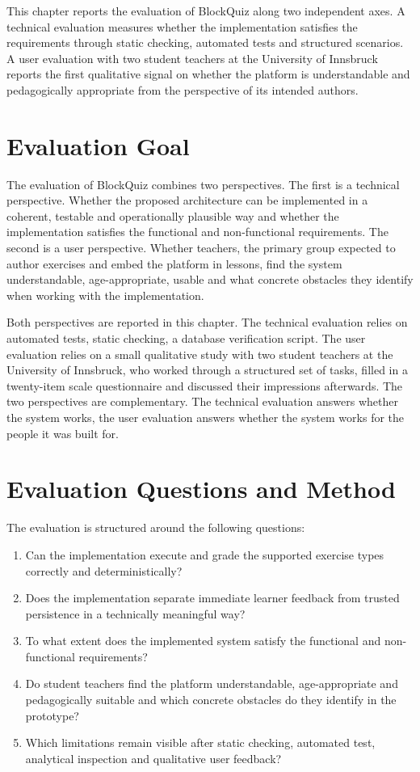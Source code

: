 This chapter reports the evaluation of BlockQuiz along two independent axes. A technical evaluation measures whether 
the implementation satisfies the requirements through static checking, 
automated tests and structured scenarios. 
A user evaluation with two student teachers at the University of Innsbruck reports the first qualitative signal 
on whether the platform is understandable and pedagogically appropriate from the perspective of its intended authors. 

\section{Evaluation Goal}
\label{sec:eval-goal}
The evaluation of BlockQuiz combines two perspectives.
The first is a technical perspective. Whether the proposed architecture can be implemented in a coherent, testable and 
operationally plausible way and whether the implementation satisfies the functional and non-functional requirements.
The second is a user perspective. Whether teachers, the primary group expected to author exercises and embed the platform 
in lessons, find the system understandable, age-appropriate, usable and what concrete obstacles they identify 
when working with the implementation.

Both perspectives are reported in this chapter. The technical evaluation relies on automated tests, static checking, 
a database verification script.
The user evaluation relies on a small qualitative study with two student teachers at the University of Innsbruck, who 
worked through a structured set of tasks, filled in a twenty-item scale questionnaire and discussed their 
impressions afterwards. The two perspectives are complementary. The technical evaluation answers whether the system
works, the user evaluation answers whether the system works for the people it was built for.

\section{Evaluation Questions and Method}
\label{sec:evaluation-questions}
The evaluation is structured around the following questions:
\begin{enumerate}
  \item Can the implementation execute and grade the supported exercise types correctly and deterministically?
  \item Does the implementation separate immediate learner feedback from trusted persistence in a technically meaningful way?
  \item To what extent does the implemented system satisfy the functional and non-functional requirements?
  \item Do student teachers find the platform understandable, age-appropriate and pedagogically suitable and 
  which concrete obstacles do they identify in the prototype?
  \item Which limitations remain visible after static checking, automated test, analytical inspection and 
  qualitative user feedback?
\end{enumerate}

